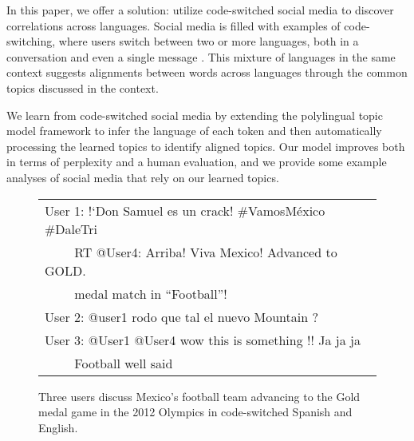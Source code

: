 \documentclass[11pt]{article}
\begin{document}
In this paper, we offer a solution: utilize code-switched social media to discover correlations across languages.
Social media is filled with examples of code-switching, where users switch between two or more languages, both
in a conversation and even a single message \cite{wangling:acl2013}.
This mixture of languages in the same context suggests alignments between words across languages through
the common topics discussed in the context.



We learn from code-switched social media by extending the polylingual topic model framework
to infer the language of each token and then automatically processing the learned topics to identify 
aligned topics.
Our model improves both in terms of perplexity and a human evaluation, and we provide some example
analyses of social media that rely on our learned topics.



\begin{figure}[t]
\scriptsize
\center
\begin{tabular}{|l|}
\hline
User 1: !`Don Samuel es un crack! \#VamosMéxico \#DaleTri\\
~~~~ RT @User4: Arriba! Viva Mexico! Advanced to GOLD. \\
~~~~ medal match in ``Football''!\\
User 2: @user1 rodo que tal el nuevo Mountain ?\\
User 3: @User1 @User4 wow this is something !! Ja ja ja \\
~~~~ Football well said\\
\hline
\end{tabular}
\caption{Three users discuss Mexico's football team advancing to the Gold medal game
in the 2012 Olympics in code-switched Spanish and English.\vspace{-.5cm}}
\label{fig:example}
\end{figure}
\end{document}
